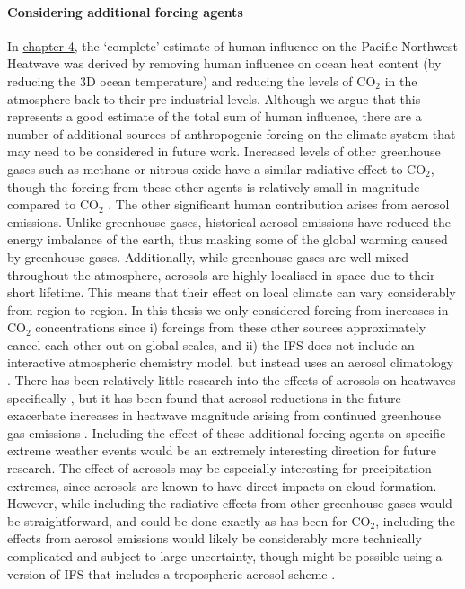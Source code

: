   \paragraph*{Considering additional forcing agents}

    In \hyperref[ch4]{chapter 4}, the `complete' estimate of human influence on the Pacific Northwest Heatwave was derived by removing human influence on ocean heat content (by reducing the 3D ocean temperature) and reducing the levels of CO$_2$ in the atmosphere back to their pre-industrial levels. Although we argue that this represents a good estimate of the total sum of human influence, there are a number of additional sources of anthropogenic forcing on the climate system that may need to be considered in future work. Increased levels of other greenhouse gases such as methane or nitrous oxide have a similar radiative effect to CO$_2$, though the forcing from these other agents is relatively small in magnitude compared to CO$_2$ \citep{masson-delmotte_earths_2021}. The other significant human contribution arises from aerosol emissions. Unlike greenhouse gases, historical aerosol emissions have reduced the energy imbalance of the earth, thus masking some of the global warming caused by greenhouse gases. Additionally, while greenhouse gases are well-mixed throughout the atmosphere, aerosols are highly localised in space due to their short lifetime. This means that their effect on local climate can vary considerably from region to region. In this thesis we only considered forcing from increases in CO$_2$ concentrations since i) forcings from these other sources approximately cancel each other out on global scales, and ii) the IFS does not include an interactive atmospheric chemistry model, but instead uses an aerosol climatology \citep{bozzo_aerosol_2020}. There has been relatively little research into the effects of aerosols on heatwaves specifically \citep{horton_review_2016}, but it has been found that aerosol reductions in the future exacerbate increases in heatwave magnitude arising from continued greenhouse gas emissions \citep{zhao_strong_2019}. Including the effect of these additional forcing agents on specific extreme weather events would be an extremely interesting direction for future research. The effect of aerosols may be especially interesting for precipitation extremes, since aerosols are known to have direct impacts on cloud formation. However, while including the radiative effects from other greenhouse gases would be straightforward, and could be done exactly as has been for CO$_2$, including the effects from aerosol emissions would likely be considerably more technically complicated and subject to large uncertainty, though might be possible using a version of IFS that includes a tropospheric aerosol scheme \citep{remy_description_2019}.

